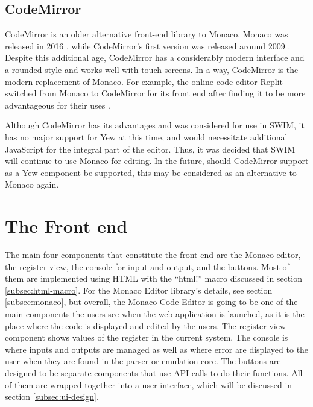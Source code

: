 \documentclass[
    parskip=half,
    fontsize=12pt,
    titlepage=firstiscover,
    toc=bibliography,
    numbers=endperiod
]{scrartcl}
\let\oldsection\section
\renewcommand{\section}{\newpage\oldsection}
\begin{document}
\subsection{CodeMirror}

CodeMirror is an older alternative front-end library to Monaco. Monaco
was released in 2016 \cite{monaco-changelog}, while CodeMirror's first version was released
around 2009 \cite{codemirror-changelog}. Despite this additional age,
CodeMirror has a considerably modern interface and a rounded style and
works well with touch screens. In a way, CodeMirror is the modern
replacement of Monaco. For example, the online code editor Replit
switched from Monaco to CodeMirror for its front end after finding it to
be more advantageous for their uses \cite{replit-code-editors}.

Although CodeMirror has its advantages and was considered for use in
SWIM, it has no major support for Yew at this time, and would
necessitate additional JavaScript for the integral part of the editor.
Thus, it was decided that SWIM will continue to use Monaco for editing.
In the future, should CodeMirror support as a Yew component be
supported, this may be considered as an alternative to Monaco again.


\section{The Front end}

The main four components that constitute the front end are the Monaco
editor, the register view, the console for input and output, and the buttons.
Most of them are implemented using HTML with the ``html!'' macro
discussed in section \ref{subsec:html-macro}. For the Monaco Editor library's details,
see section \ref{subsec:monaco}, but overall, the Monaco Code Editor is going to be one
of the main components the users see when the web application is launched, as it
is the place where the code is displayed and edited by the users. The
register view component shows values of the register in the current
system. The console is where inputs and outputs are managed as well as
where error are displayed to the user when they are found in the parser or emulation core. The buttons are
designed to be separate components that use API calls to do their
functions. All of them are wrapped together into a user interface, which
will be discussed in section \ref{subsec:ui-design}.
\end{document}
